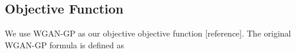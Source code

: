 \subsection{Objective Function}
We use WGAN-GP as our objective objective function [reference]. The original WGAN-GP formula is defined as 